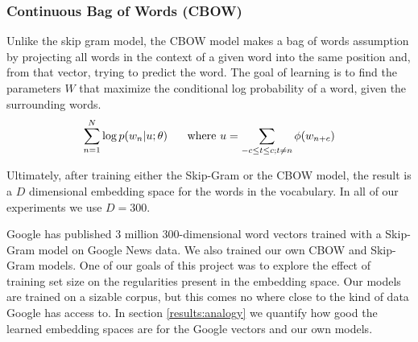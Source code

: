 \subsubsection{Continuous Bag of Words (CBOW)}
Unlike the skip gram model, the CBOW model makes a bag of words assumption by projecting all words in the context of a given word into the same position and, from that vector, trying to predict the word. The goal of learning is to find the parameters $W$ that maximize the conditional log probability of a word, given the surrounding words. 
\begin{align*}
	\sum_{n=1}^N \log p(w_n| u;\theta) \hspace{5mm} \text{ where } u = \sum_{-c \leq t \leq c; t \neq n} \phi(w_{n+c} )
\end{align*}


Ultimately, after training either the Skip-Gram or the CBOW model, the result is a $D$ dimensional embedding space for the words in the vocabulary. In all of our experiments we use $D = 300$. 

Google has published 3 million 300-dimensional word vectors trained with a Skip-Gram model on Google News data. We also trained our own CBOW and Skip-Gram models. One of our goals of this project was to explore the effect of training set size on the regularities present in the embedding space. Our models are trained on a sizable corpus, but this comes no where close to the kind of data Google has access to. In section \ref{results:analogy} we quantify how good the learned embedding spaces are for the Google vectors and our own models. 

